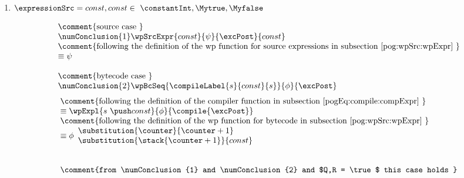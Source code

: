 \begin{enumerate} 
		\item    $\expressionSrc = const , const \in \ \constantInt, \Mytrue, \Myfalse $
                     
		     $$ \begin{array}{l}  
		               \mbox{\rm\comment{source case }} \\
		              \numConclusion{1} \wpSrcExpr{ const}{\psi}{ \excPost}{const}  \\
		    	       \mbox{\rm\comment{following the definition of the wp function for source expressions in subsection  \ref{pog:wpSrc:wpExpr} }} \\
			       \equiv \psi \\
			       \\
			       \mbox{\rm\comment{bytecode case }} \\
		               \numConclusion{2} \wpBcSeq{\compileLabel{s}{const}{s} }{\phi}{ \excPost}  \\
			\end{array}$$ 
                       $$ \begin{array}{l}  
		               
		    	       \mbox{\rm\comment{following the definition   of the compiler function in subsection \ref{pogEq:compile:compExpr} }} \\
			       \equiv \wpExpl{s \ \push const }{\phi}{ \compile{\excPost}}  \\
			       \mbox{\rm\comment{following the definition of the wp function for bytecode in subsection \ref{pog:wpSrc:wpExpr}  }} \\
			       \equiv \phi \begin{array}{l}
                                                \substitution{ \counter }{ \counter + 1}\\
						\substitution{\stack{ \counter +1} }{const  }
					    \end{array} \\
			        \\
				\\
				 \mbox{\rm\comment{from \numConclusion{1} and   \numConclusion{2} and $Q,R = \true $ this case holds   }} \\
					 
				    
			\end{array}$$
                        
			
			

\end{enumerate}
